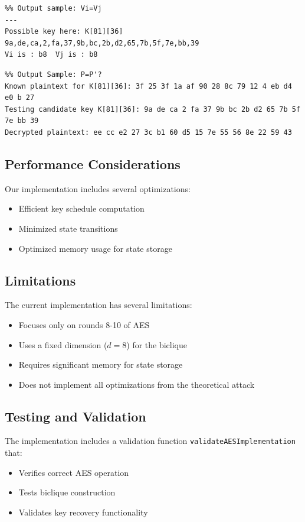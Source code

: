 \documentclass{report}
\begin{document}
\begin{verbatim}
%% Output sample: Vi=Vj
---
Possible key here: K[81][36]
9a,de,ca,2,fa,37,9b,bc,2b,d2,65,7b,5f,7e,bb,39
Vi is : b8	Vj is : b8
\end{verbatim}

\begin{verbatim}
%% Output Sample: P=P'?
Known plaintext for K[81][36]: 3f 25 3f 1a af 90 28 8c 79 12 4 eb d4 e0 b 27 
Testing candidate key K[81][36]: 9a de ca 2 fa 37 9b bc 2b d2 65 7b 5f 7e bb 39 
Decrypted plaintext: ee cc e2 27 3c b1 60 d5 15 7e 55 56 8e 22 59 43
\end{verbatim}

\subsection{Performance Considerations}
Our implementation includes several optimizations:
\begin{itemize}
    \item Efficient key schedule computation
    \item Minimized state transitions
    \item Optimized memory usage for state storage
\end{itemize}

\subsection{Limitations}
The current implementation has several limitations:
\begin{itemize}
    \item Focuses only on rounds 8-10 of AES
    \item Uses a fixed dimension ($d = 8$) for the biclique
    \item Requires significant memory for state storage
    \item Does not implement all optimizations from the theoretical attack
\end{itemize}

\subsection{Testing and Validation}
The implementation includes a validation function \texttt{validateAESImplementation} that:
\begin{itemize}
    \item Verifies correct AES operation
    \item Tests biclique construction
    \item Validates key recovery functionality
\end{itemize}
\end{document}

